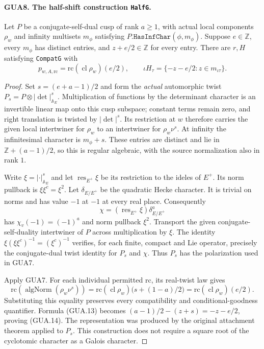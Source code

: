 \paragraph{GUA8. The half-shift construction \texttt{HalfG}.}
\label{claim:GUA8}
Let $P$ be a conjugate-self-dual cusp of rank $a\geq1$,
with actual local components $\rho_w$ and infinity
multisets $m_\phi$ satisfying $P.\texttt{HasInfChar}(\phi,m_\phi)$.
Suppose $e\in\mathbb Z$, every $m_\phi$ has distinct
entries, and $z+e/2\in\mathbb Z$ for every entry.
There are $r,H$ satisfying \texttt{CompatG} with
\[
       p_{w,A,\mathrm{rc}}
                       =\mathrm{rc}(\operatorname{cl}\rho_w)(e/2),
       \qquad
       \iota H_\tau=\{-z-e/2:z\in m_{\iota\tau}\}.
                                                        \tag{GUA.14}
\]
\begin{proof}
Set $s=(e+a-1)/2$ and form the \emph{actual}
automorphic twist $P_s=P\otimes|\det|_{\mathbb A_E}^{s}$.
Multiplication of functions by the determinant character
is an invertible linear map onto this cusp subspace;
constant terms remain zero, and right translation is
twisted by $|\det|^s$.  Its restriction at $w$ therefore
carries the given local intertwiner for $\rho_w$ to
an intertwiner for $\rho_w\nu^s$.  At infinity the
infinitesimal character is $m_\phi+s$.  These entries
are distinct and lie in $\mathbb Z+(a-1)/2$, so this
is regular algebraic, with the source normalization
also in rank $1$.

Write $\xi=|\cdot|_{\mathbb A_E}^{s}$ and let
$\operatorname{res}_{E^+}\xi$ be its restriction to
the ideles of $E^+$.  Its norm pullback is
$\xi\xi^c=\xi^2$.  Let $\delta_{E/E^+}$ be the
quadratic Hecke character.  It is trivial on norms
and has value $-1$ at $-1$ at every real place.
Consequently
\[
        \chi=(\operatorname{res}_{E^+}\xi)
                                  \delta_{E/E^+}^{a}
\]
has $\chi_v(-1)=(-1)^a$ and norm pullback $\xi^2$.
Transport the given conjugate-self-duality intertwiner
of $P$ across multiplication by $\xi$.  The identity
$\xi(\xi\xi^c)^{-1}=(\xi^c)^{-1}$ verifies, for
each finite, compact and Lie operator, precisely the
conjugate-dual twist identity for $P_s$ and $\chi$.
Thus $P_s$ has the polarization used in GUA7.

Apply GUA7.  For each individual permitted $\mathrm{rc}$,
its real-twist law gives
\[
 \mathrm{rc}(\operatorname{algNorm}(\rho_w\nu^s))
  =\mathrm{rc}(\operatorname{cl}\rho_w)
                       \bigl(s+(1-a)/2\bigr)
  =\mathrm{rc}(\operatorname{cl}\rho_w)(e/2).
\]
Substituting this equality preserves every compatibility
and conditional-goodness quantifier.  Formula (GUA.13)
becomes $(a-1)/2-(z+s)=-z-e/2$, proving (GUA.14).
The representation was produced by the original
attachment theorem applied to $P_s$.  This construction
does not require a square root of the cyclotomic
character as a Galois character.
\end{proof}

